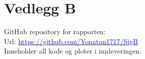 \hypertarget{Vedlegg B}{}
\section*{Vedlegg B}
\appendix
GitHub repository for rapporten: \\
\indent Url: \href{https://github.com/Yonatan1717/SigB}{\textcolor{blue}{https://github.com/Yonatan1717/SigB}}\\
\indent Inneholder all kode og ploter i innleveringen.
